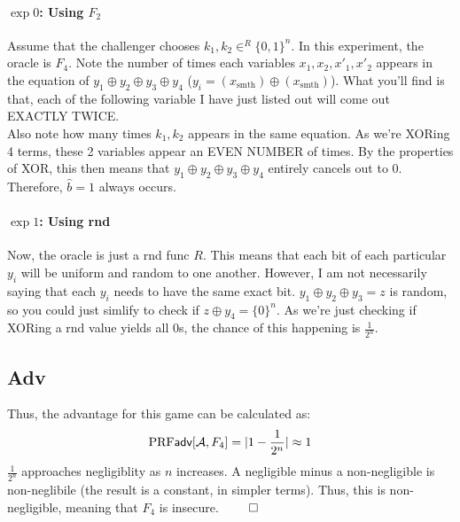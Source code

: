 \documentclass[12pt]{article}
\theoremstyle{plain}
\theoremstyle{definition}
\begin{document}
\begin{problem}
\begin{solution}
\paragraph{$\exp 0$: Using $F_2$}
Assume that the challenger chooses $k_1, k_2 \in^R \{0, 1\}^n$. In this experiment, the oracle is $F_4$. Note the number of times each variables 
$x_1, x_2, x'_1, x'_2$ appears in the equation of $y_1 \oplus y_2 \oplus y_3 \oplus y_4$ ($y_i = (x_{\text{smth}}) \oplus (x_{\text{smth}})$). What you'll find is that, 
each of the following variable I have just listed out will come out EXACTLY TWICE.\\
\indent Also note how many times $k_1, k_2$ appears in the same equation. As we're XORing 4 terms, these 2 variables appear an EVEN NUMBER of times. 
By the properties of XOR, this then means that $y_1 \oplus y_2 \oplus y_3 \oplus y_4$ entirely cancels out to $0$. Therefore, $\hat{b} = 1$ always occurs.

\paragraph{$\exp 1$: Using rnd}
Now, the oracle is just a rnd func $R$. This means that each bit of each particular $y_i$ will be uniform and random to one another. However, I am not
necessarily saying that each $y_i$ needs to have the same exact bit. $y_1 \oplus y_2 \oplus y_3 = z$ is random, so you could just simlify to check if
$z \oplus y_4 = \{0\}^n$. As we're just checking if XORing a rnd value yields all $0$s, the chance of this happening is $\frac{1}{2^n}$.

\subsection*{Adv}
Thus, the advantage for this game can be calculated as:
\begin{equation*}
  \textrm{PRF}\textsf{adv}[\mathcal{A}, F_4] = |1 - \frac{1}{2^n}| \approx 1
\end{equation*}
$\frac{1}{2^n}$ approaches negligiblity as $n$ increases. A negligible minus a non-negligible is non-neglibile (the result is a constant, in simpler terms). Thus, this is non-negligible, meaning that $F_4$ is insecure. $\qed$
\end{solution}
\end{problem}
\end{document}
